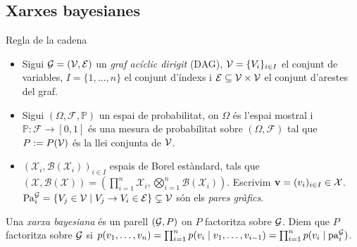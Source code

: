\documentclass{bestbeamer}
\begin{document}
\subsection{Xarxes bayesianes}

\begin{frame}{Regla de la cadena}
\begin{itemize}
  \item Sigui $\mathcal{G}=(\mathcal{V},\mathcal{E})$ un \textit{graf acíclic dirigit} (DAG), $\mathcal{V}=\{V_i\}_{i\in I}$ el conjunt de variables, $I=\{1,\dotsc,n\}$ el conjunt d'índexs i $\mathcal{E}\subseteq \mathcal{V}\times \mathcal{V}$ el conjunt d'arestes del graf. 
  \item Sigui $(\Omega,\mathcal{F},\mathbb{P})$ un espai de probabilitat, on $\Omega$ és l'espai mostral i $\mathbb{P}:\mathcal{F}\longrightarrow[0,1]$ és una mesura de probabilitat sobre $(\Omega,\mathcal{F})$ tal que $P:=P(\mathcal{V})$ és la llei conjunta de $\mathcal{V}$.
  \item $(\mathcal{X}_i,\mathcal{B}(\mathcal{X}_i))_{i\in I}$ espais de Borel estàndard, tals que $(\mathcal{X},\mathcal{B}(\mathcal{X}))=(\prod_{i=1}^n\mathcal{X}_i,\bigotimes_{i=1}^n\mathcal{B}(\mathcal{X}_i))$. Escrivim $\mathbf{v}=(v_i)_{i\in I}\in\mathcal{X}$. $\operatorname{Pa}_i^\mathcal{G}=\{V_j\in\mathcal{V} \mid V_j\to V_i\in\mathcal{E}\}\subsetneq\mathcal{V}$ són els \textit{pares gràfics}.
\end{itemize}
\begin{definition}
Una \textit{xarxa bayesiana} és un parell $(\mathcal{G},P)$ on $P$ factoritza sobre $\mathcal{G}$. Diem que $P$ factoritza sobre $\mathcal{G}$ si $p(v_1,\dotsc,v_n)=\prod_{i=1}^n p(v_i\mid v_1,\dotsc,v_{i-1})=\prod_{i=1}^n p(v_i\mid \operatorname{pa}_i^{\mathcal{G}})$.
\end{definition}
\end{frame}
\end{document}
